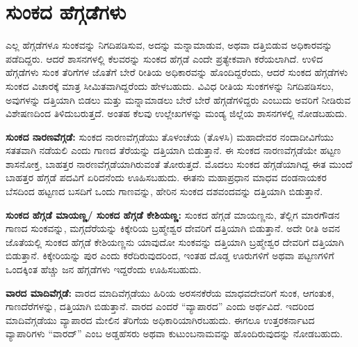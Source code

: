 \section{ಸುಂಕದ ಹೆಗ್ಗಡೆಗಳು}

ಎಲ್ಲ ಹೆಗ್ಗಡೆಗಳೂ ಸುಂಕವನ್ನು ನಿಗದಿಪಡಿಸುವ, ಅದನ್ನು ಮನ್ನಾಮಾಡುವ, ಅಥವಾ ದತ್ತಿಬಿಡುವ ಅಧಿಕಾರವನ್ನು ಪಡೆದಿದ್ದರು. ಆದರೆ ಶಾಸನಗಳಲ್ಲಿ ಕೆಲವರನ್ನು ಸುಂಕದ ಹೆಗ್ಗಡೆ ಎಂದೇ ಪ್ರತ್ಯೇಕವಾಗಿ ಕರೆಯಲಾಗಿದೆ. ಉಳಿದ ಹೆಗ್ಗಡೆಗಳು ಸುಂಕ ತೆರಿಗೆಗಳ ಜೊತೆಗೆ ಬೇರೆ ರೀತಿಯ ಅಧಿಕಾರವನ್ನು ಹೊಂದಿದ್ದರೆಂದು, ಆದರೆ ಸುಂಕದ ಹೆಗ್ಗಡೆಗಳು ಸುಂಕದ ವಿಚಾರಕ್ಕೆ ಮಾತ್ರ ಸೀಮಿತವಾಗಿದ್ದರೆಂದು ಹೇಳಬಹುದು. ವಿವಿಧ ರೀತಿಯ ಸುಂಕಗಳನ್ನು ನಿಗದಿಪಡಿಸಲು, ಅವುಗಳನ್ನು ದತ್ತಿಯಾಗಿ ಬಿಡಲು ಮತ್ತು ಮನ್ನಾಮಾಡಲು ಬೇರೆ ಬೇರೆ ಹೆಗ್ಗಡೆಗಳಿದ್ದರು ಎಂಬುದು ಅವರಿಗೆ ನೀಡಿರುವ ವಿಶೇಷಣದಿಂದ ತಿಳಿದುಬರುತ್ತದೆ. ಅಂತಹ ಕೆಲವು ಉಲ್ಲೇಖಗಳನ್ನು ಮಂಡ್ಯ ಜಿಲ್ಲೆಯ ಶಾಸನಗಳಲ್ಲಿ ನೋಡಬಹುದು.

\textbf{ಸುಂಕದ ನಾರಣವೆಗ್ಗಡೆ:} ಸುಂಕದ ನಾರಣವೆಗ್ಗಡೆಯು ತೊಳಂಚೆಯ (ತೊಳಸಿ) ಮಹಾದೇವರ ನಂದಾದೀವಿಗೆಯು ಸತತವಾಗಿ ನಡೆಯಲಿ ಎಂದು ಗಾಣದ ತೆರೆಯನ್ನು ದತ್ತಿಯಾಗಿ ಬಿಡುತ್ತಾನೆ. ಈ ಸುಂಕದ ನಾರಣವೆಗ್ಗಡೆಯೇ ಹಟ್ಟಣ ಶಾಸನೋಕ್ತ, ಬಾಹತ್ತರ ನಾರಣವೆಗ್ಗಡೆಯಾಗಿರುವಂತೆ ತೋರುತ್ತದೆ. ಮೊದಲು ಸುಂಕದ ಹೆಗ್ಗಡೆಯಾಗಿದ್ದ ಈತ ಮುಂದೆ ಬಾಹತ್ತರ ಹೆಗ್ಗಡೆ ಪದವಿಗೆ ಏರಿದನೆಂದು ಊಹಿಸಬಹುದು. ಈತನು ಮಹಾಪ್ರಧಾನ ಮಾಧವ ದಂಡನಾಯಕರ ಬೆಸದಿಂದ ಹಟ್ಟಣದ ಬಸದಿಗೆ ಒಂದು ಗಾಣವನ್ನು, ಹೇರಿನ ಸುಂಕದ ದಶವಂದವನ್ನು ದತ್ತಿಯಾಗಿ ಬಿಡುತ್ತಾನೆ.

\textbf{ಸುಂಕದ ಹೆಗ್ಗಡೆ ಮಾಯಣ್ಣ/ ಸುಂಕದ ಹೆಗ್ಗಡೆ ಕೇಶಿಯಣ್ಣ:} ಸುಂಕದ ಹೆಗ್ಗಡೆ ಮಾಯಣ್ಣನು, ತೆಲ್ಲಿಗ ಮಾರಗೌಡನ ಗಾಣದ ಸುಂಕವನ್ನು, ಮಗ್ಗದೆರೆಯನ್ನು ಕಿಕ್ಕೇರಿಯ ಬ್ರಹ್ಮೇಶ್ವರ ದೇವರಿಗೆ ದತ್ತಿಯಾಗಿ ಬಿಡುತ್ತಾನೆ. ಅದೇ ರೀತಿ ಅವನ ಜೊತೆಯಲ್ಲಿ ಸುಂಕದ ಹೆಗ್ಗಡೆ ಕೇಶಿಯಣ್ಣನು ಯಾವುದೋ ಸುಂಕವನ್ನು ದತ್ತಿಯಾಗಿ ಬ್ರಹ್ಮೇಶ್ವರ ದೇವರಿಗೆ ದತ್ತಿಯಾಗಿ ಬಿಡುತ್ತಾನೆ. ಕಿಕ್ಕೇರಿಯನ್ನು ಪುರ ಎಂದು ಕರೆದಿರುವುದರಿಂದ, ಇಂತಹ ದೊಡ್ಡ ಊರುಗಳಿಗೆ ಅಥವಾ ಪಟ್ಟಣಗಳಿಗೆ ಒಂದಕ್ಕಿಂತ ಹೆಚ್ಚು ಜನ ಹೆಗ್ಗಡೆಗಳು ಇದ್ದರೆಂದು ಊಹಿಸಬಹುದು.

\textbf{ವಾರದ ಮಾದಿವೆಗ್ಗಡೆ:} ವಾರದ ಮಾದಿವೆಗ್ಗಡೆಯು ಹಿರಿಯ ಅರಸನಕೆರೆಯ ಮಾಧವದೇವರಿಗೆ ಸುಂಕ, ಆಗಂತುಕ, ಗಾಣದೆರೆಗಳನ್ನು, ದತ್ತಿಯಾಗಿ ಬಿಡುತ್ತಾನೆ. ವಾರದ ಎಂದರೆ “ವ್ಯಾಪಾರದ” ಎಂದು ಅರ್ಥವಿದೆ. ಇದರಿಂದ ಮಾದಿವೆಗ್ಗಡೆಯು ವ್ಯಾಪಾರದ ಮೇಲಿನ ತೆರಿಗೆಯ ಅಧಿಕಾರಿಯಾಗಿರಬಹುದು. ಈಗಲೂ ಉತ್ತರಕರ್ನಾಟದ ವ್ಯಾಪಾರಿಗಳು “ವಾರದ್​” ಎಂಬ ಅಡ್ಡಹೆಸರು ಅಥವಾ ಕುಟುಂಬನಾಮವನ್ನು ಹೊಂದಿರುವುದನ್ನು ನೋಡಬಹುದು.

